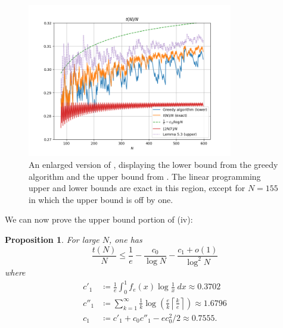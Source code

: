 \documentclass[12pt,a4paper,reqno]{amsart}
\numberwithin{equation}{section}
\theoremstyle{plain}
\newtheorem{proposition}[theorem]{Proposition}
\theoremstyle{definition}
\begin{document}
\begin{figure}
  \centering
  \includegraphics[width=0.8\textwidth]{newplot_600.png}
  \caption{An enlarged version of , displaying the lower bound from the greedy algorithm and the upper bound from .  The linear programming upper and lower bounds are exact in this region, except for $N=155$ in which the upper bound is off by one.}\label{fig-zoom}
\end{figure}


We can now prove the upper bound portion of (iv):

  \begin{proposition}\label{upper-bound}  For large $N$, one has
    $$ \frac{t(N)}{N} \leq \frac{1}{e} - \frac{c_0}{\log N} - \frac{c_1 + o(1)}{\log^2 N}$$
    where
    \begin{align*}
      c'_1 &\coloneqq \frac{1}{e} \int_0^1 f_e(x) \log \frac{1}{x}\ dx \approx 0.3702\\
      c''_1 &\coloneqq \sum_{k=1}^\infty \frac{1}{k}  \log\left( \frac{e}{k} \left\lceil \frac{k}{e} \right\rceil \right) \approx 1.6796\\
      c_1 &\coloneqq c'_1 + c_0 c''_1 - ec_0^2/2 \approx 0.7555.
    \end{align*}
  \end{proposition}
    
\end{document}
